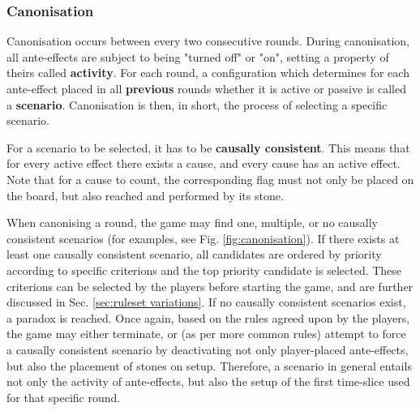 \documentclass[12pt]{article}
\begin{document}
	\subsubsection{Canonisation}\label{sec:canonisation}
	Canonisation occurs between every two consecutive rounds. During canonisation, all ante-effects are subject to being "turned off" or "on", setting a property of theirs called \textbf{activity}. For each round, a configuration which determines for each ante-effect placed in all \textbf{previous} rounds whether it is active or passive is called a \textbf{scenario}. Canonisation is then, in short, the process of selecting a specific scenario.
	
	For a scenario to be selected, it has to be \textbf{causally consistent}. This means that for every active effect there exists a cause, and every cause has an active effect. Note that for a cause to count, the corresponding flag must not only be placed on the board, but also reached and performed by its stone.
	
	When canonising a round, the game may find one, multiple, or no causally consistent scenarios (for examples, see Fig. \ref{fig:canonisation}). If there exists at least one causally consistent scenario, all candidates are ordered by priority according to specific criterions and the top priority candidate is selected. These criterions can be selected by the players before starting the game, and are further discussed in Sec. \ref{sec:ruleset variations}. If no causally consistent scenarios exist, a paradox is reached. Once again, based on the rules agreed upon by the players, the game may either terminate, or (as per more common rules) attempt to force a causally consistent scenario by deactivating not only player-placed ante-effects, but also the placement of stones on setup. Therefore, a scenario in general entails not only the activity of ante-effects, but also the setup of the first time-slice used for that specific round.
	
\end{document}
